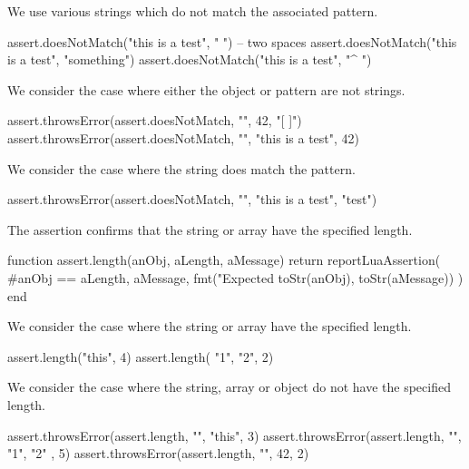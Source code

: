 We use various strings which do not match the associated pattern. 

\startLuaTest
  assert.doesNotMatch("this is a test", "  ") -- two spaces
  assert.doesNotMatch("this is a test", "something")
  assert.doesNotMatch("this is a test", "^ ")
\stopLuaTest
\stopTestCase


We consider the case where either the object or pattern are not strings. 

\startLuaTest
  assert.throwsError(assert.doesNotMatch, "", 42, "[ ]")
  assert.throwsError(assert.doesNotMatch, "",
    "this is a test", 42)
\stopLuaTest
\stopTestCase


We consider the case where the string does match the pattern.

\startLuaTest
  assert.throwsError(assert.doesNotMatch, "", "this is a test", "test")
\stopLuaTest
\stopTestCase

\stopTestSuite


The  assertion confirms that the string or array have 
the specified length. 

\startLuaCode
function assert.length(anObj, aLength, aMessage)
  return reportLuaAssertion(
    #anObj == aLength,
    aMessage,
    fmt("Expected %
      toStr(anObj), toStr(aMessage))
  )
end
\stopLuaCode


We consider the case where the string or array have the specified length. 

\startLuaTest
  assert.length("this", 4)
  assert.length({ "1", "2"}, 2)
\stopLuaTest
\stopTestCase


We consider the case where the string, array or object do not have the 
specified length. 

\startLuaTest
  assert.throwsError(assert.length, "", "this", 3)
  assert.throwsError(assert.length, "", { "1", "2" }, 5)
  assert.throwsError(assert.length, "", 42, 2)
\stopLuaTest
\stopTestCase

\stopTestSuite

